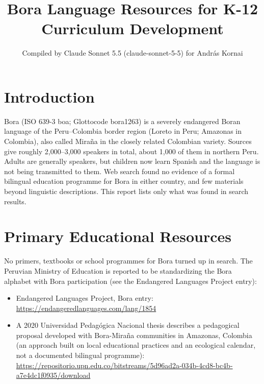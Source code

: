 \documentclass[12pt]{article}
\title{Bora Language Resources for K-12 Curriculum Development}
\author{Compiled by Claude Sonnet 5.5 (claude-sonnet-5-5) for Andr\'as Kornai}
\date{}
\begin{document}
\maketitle

\section{Introduction}
Bora (ISO 639-3 boa; Glottocode bora1263) is a severely endangered Boran language of the Peru--Colombia border region (Loreto in Peru; Amazonas in Colombia), also called Mira\~na in the closely related Colombian variety. Sources give roughly 2,000--3,000 speakers in total, about 1,000 of them in northern Peru. Adults are generally speakers, but children now learn Spanish and the language is not being transmitted to them. Web search found no evidence of a formal bilingual education programme for Bora in either country, and few materials beyond linguistic descriptions. This report lists only what was found in search results.

\section{Primary Educational Resources}
No primers, textbooks or school programmes for Bora turned up in search. The Peruvian Ministry of Education is reported to be standardizing the Bora alphabet with Bora participation (see the Endangered Languages Project entry):
\begin{itemize}
\item Endangered Languages Project, Bora entry: \url{https://endangeredlanguages.com/lang/1854}
\item A 2020 Universidad Pedag\'ogica Nacional thesis describes a pedagogical proposal developed with Bora-Mira\~na communities in Amazonas, Colombia (an approach built on local educational practices and an ecological calendar, not a documented bilingual programme): \url{https://repositorio.upn.edu.co/bitstreams/5d96ad2a-034b-4cd8-bc4b-a7e4dc1f0935/download}
\end{itemize}
\end{document}
